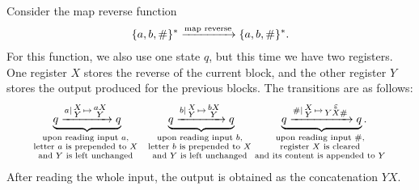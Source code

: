 \begin{myexample}
    \label{ex:map-reverse-function-sst}
    Consider the map reverse function
    \begin{align*}
    \{a,b,\#\}^* 
    \xrightarrow {\text{map reverse}}
    \{a,b,\#\}^*.
    \end{align*}
    For this function, we also use one state $q$, but this time we have two registers. One register $X$ stores the reverse of the current block, and the other register $Y$ stores the output produced for the previous blocks. The transitions are as follows:
\begin{align*}
     \myunderbrace{
         q
        \xrightarrow {a \mid 
        \begin{smallmatrix}
            X \\ 
            Y
        \end{smallmatrix}
        \mapsto 
        \begin{smallmatrix}
            aX \\ 
            Y
        \end{smallmatrix}}
        q 
     }
     {upon reading input $a$, \\ letter $a$ is prepended to $X$ \\ and $Y$ is left unchanged}\qquad \qquad 
     \myunderbrace{
         q
        \xrightarrow {b \mid 
        \begin{smallmatrix}
            X \\ 
            Y
        \end{smallmatrix}
        \mapsto 
        \begin{smallmatrix}
            bX \\ 
            Y
        \end{smallmatrix}}
        q 
     }
     {upon reading input $b$, \\ letter $b$ is prepended to $X$ \\ and $Y$ is left unchanged}
        \qquad \qquad
        \myunderbrace{
            q           \xrightarrow {\# \mid 
        \begin{smallmatrix}            X \\ 
            Y
        \end{smallmatrix}        \mapsto 
        \begin{smallmatrix}            \varepsilon \\ 
            YX\#
        \end{smallmatrix}}
        q
     }
     {upon reading input $\#$, \\ register $X$ is cleared \\ and its content is appended to $Y$}.
    \end{align*}
    After reading the whole input, the output is obtained as the concatenation $YX$.  
\end{myexample}

